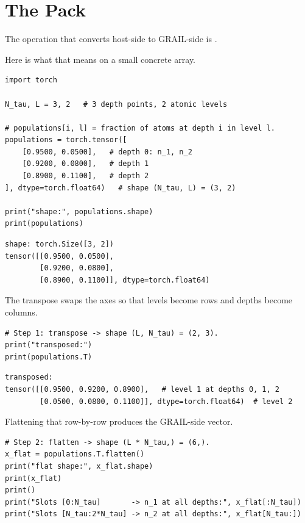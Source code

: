 \section{The Pack}
\label{sec:pack}

The operation that converts host-side to GRAIL-side is
.

Here is what that means on a small concrete array.

\begin{lstlisting}[style=grailInStyle]
import torch

N_tau, L = 3, 2   # 3 depth points, 2 atomic levels

# populations[i, l] = fraction of atoms at depth i in level l.
populations = torch.tensor([
    [0.9500, 0.0500],   # depth 0: n_1, n_2
    [0.9200, 0.0800],   # depth 1
    [0.8900, 0.1100],   # depth 2
], dtype=torch.float64)   # shape (N_tau, L) = (3, 2)

print("shape:", populations.shape)
print(populations)
\end{lstlisting}

\begin{lstlisting}[style=grailOutStyle]
shape: torch.Size([3, 2])
tensor([[0.9500, 0.0500],
        [0.9200, 0.0800],
        [0.8900, 0.1100]], dtype=torch.float64)
\end{lstlisting}

The transpose swaps the axes so that levels become rows and depths become
columns.

\begin{lstlisting}[style=grailInStyle]
# Step 1: transpose -> shape (L, N_tau) = (2, 3).
print("transposed:")
print(populations.T)
\end{lstlisting}

\begin{lstlisting}[style=grailOutStyle]
transposed:
tensor([[0.9500, 0.9200, 0.8900],   # level 1 at depths 0, 1, 2
        [0.0500, 0.0800, 0.1100]], dtype=torch.float64)  # level 2
\end{lstlisting}

Flattening that row-by-row produces the GRAIL-side vector.

\begin{lstlisting}[style=grailInStyle]
# Step 2: flatten -> shape (L * N_tau,) = (6,).
x_flat = populations.T.flatten()
print("flat shape:", x_flat.shape)
print(x_flat)
print()
print("Slots [0:N_tau]       -> n_1 at all depths:", x_flat[:N_tau])
print("Slots [N_tau:2*N_tau] -> n_2 at all depths:", x_flat[N_tau:])
\end{lstlisting}

